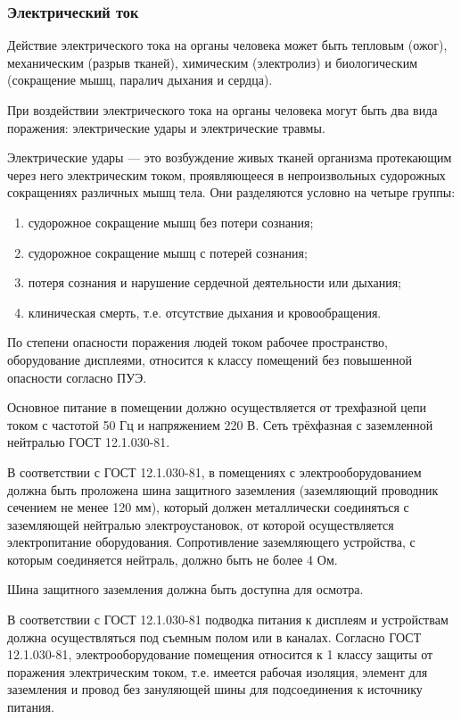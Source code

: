 \subsubsection{Электрический ток}

Действие электрического тока на органы человека может быть тепловым (ожог), механическим (разрыв тканей), химическим (электролиз) и биологическим (сокращение мышц, паралич дыхания и сердца).

При воздействии электрического тока на органы человека могут быть два вида поражения: электрические удары и электрические травмы.

Электрические удары --- это возбуждение живых тканей организма протекающим через него электрическим током, проявляющееся в непроизвольных судорожных сокращениях различных мышц тела.
Они разделяются условно на четыре группы:
\begin{enumerate}
  \item{судорожное сокращение мышц без потери сознания;}
  \item{судорожное сокращение мышц с потерей сознания;}
  \item{потеря сознания и нарушение сердечной деятельности или дыхания;}
  \item{клиническая смерть, т.е. отсутствие дыхания и кровообращения.}
\end{enumerate}

По степени опасности поражения людей током рабочее пространство, оборудование дисплеями, относится к классу помещений без повышенной опасности согласно ПУЭ.

Основное питание в помещении должно осуществляется от трехфазной цепи током с частотой 50 Гц и напряжением 220 В.
Сеть трёхфазная с заземленной нейтралью ГОСТ 12.1.030-81.

В соответствии с ГОСТ 12.1.030-81, в помещениях с электрооборудованием должна быть проложена шина защитного заземления (заземляющий проводник сечением не менее 120 мм), который должен металлически соединяться с заземляющей нейтралью электроустановок, от которой осуществляется электропитание оборудования.
Сопротивление заземляющего устройства, с которым соединяется нейтраль, должно быть не более 4 Ом.

Шина защитного заземления должна быть доступна для осмотра.

В соответствии с ГОСТ 12.1.030-81 подводка питания к дисплеям и устройствам должна осуществляться под съемным полом или в каналах.
Согласно ГОСТ 12.1.030-81, электрооборудование помещения относится к 1 классу защиты от поражения электрическим током, т.е. имеется рабочая изоляция, элемент для заземления и провод без зануляющей шины для подсоединения к источнику питания.


